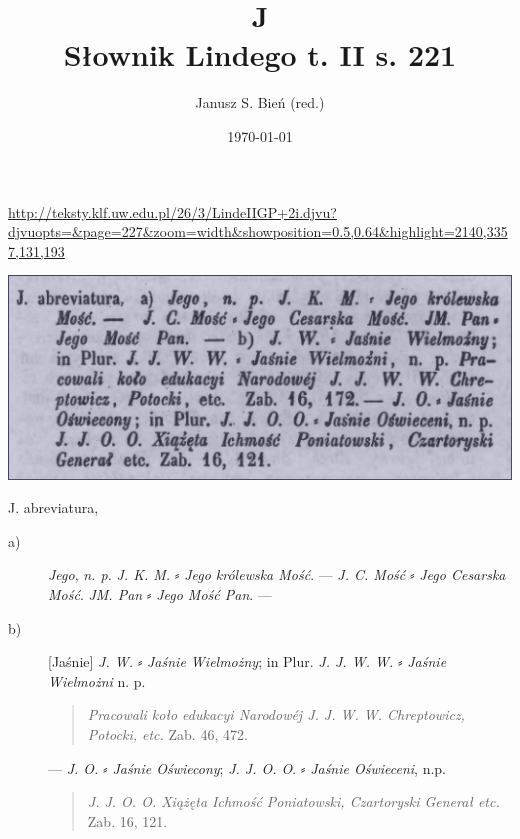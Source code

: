 \documentclass[12pt]{article}
\title{J\\Słownik Lindego t. II s. 221}
\author{Janusz S. Bień (red.)}
\date{\today}
\newcommand{\doh}[1]{⸗}
\begin{document}
\maketitle

\obeylines

\url{http://teksty.klf.uw.edu.pl/26/3/LindeIIGP+2i.djvu?djvuopts=&page=227&zoom=width&showposition=0.5,0.64&highlight=2140,3357,131,193}

\bigskip
\includegraphics{J-Linde}

\smallskip
\noindent
J. abreviatura,

\begin{description}
\item[a)] \textit{Jego},
\textit{n. p.}
\textit{J. K. M.}  \doh{} \textit{Jego królewska Mość}.
---
\textit{J. C. Mość} ⸗ \textit{Jego Cesarska Mość}.
\textit{JM. Pan} ⸗ \textit{Jego Mość Pan}.
---
\item[b)] [Jaśnie]
\textit{J. W.} ⸗ \textit{Jaśnie Wielmożny};
in Plur. \textit{J. J. W. W.} ⸗ \textit{Jaśnie Wielmożni}
n. p.
\begin{quote}
\textit{Pracowali koło edukacyi Narodowéj J. J. W. W. Chreptowicz, Potocki,%
  etc.}
  Zab. 46, 472.
\end{quote}
---
\textit{J. O.} ⸗ \textit{Jaśnie Oświecony};
\textit{J. J. O. O}. ⸗ \textit{Jaśnie Oświeceni},
n.p.
\begin{quote}
  \textit{J. J. O. O. Xiążęta Ichmość Poniatowski, Czartoryski Generał etc.}
  Zab. 16, 121.
\end{quote}
\end{description}
\end{document}
